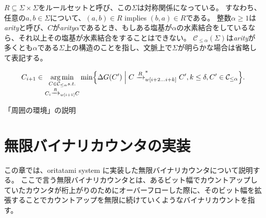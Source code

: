 \documentclass[a4j,11pt]{article}
\DeclareMathOperator*{\argmin}{arg\,min}
\begin{document}
$R \subseteq \Sigma \times \Sigma$をルールセットと呼び、この$\Sigma$は対称関係になっている。
すなわち、任意の$a, b \in \Sigma$について、$(a, b) \in R$ implies $(b, a) \in R$である。
整数$\alpha \ge 1$は\textit{arity}と呼び、$C$が\textit{arity}$\alpha$であるとき、もしある塩基が$\alpha$の水素結合をしているなら、それ以上その塩基が水素結合をすることはできない。
$\mathcal{C}_{\le \alpha}(\Sigma)$は\textit{arity}が多くとも$\alpha$である$\Sigma$上の構造のことを指し、文脈上で$\Sigma$が明らかな場合は省略して表記する。

\begin{equation}
\label{eq:OS_CF}
C_{i+1} \in \argmin_{
\substack{
C \in \mathcal{C}_{\le \alpha} s.t. \\
C_i \xrightarrow{R}_{w[i+1]}C \\
}
}
\min \Bigl\{ \Delta G(C') \Bigm|
C \xrightarrow{R}^*_{w[i+2...i+k]}C', k\le \delta, C' \in \mathcal{C}_{\le \alpha}
\Bigr\}.
\end{equation}

「周囲の環境」の説明

\section{無限バイナリカウンタの実装}
この章では、oritatami system に実装した無限バイナリカウンタについて説明する。
ここで言う無限バイナリカウンタとは、あるビット幅でカウントアップしていたカウンタが桁上がりのためにオーバーフローした際に、そのビット幅を拡張することでカウントアップを無限に続けていくようなバイナリカウントを指す。
\end{document}

